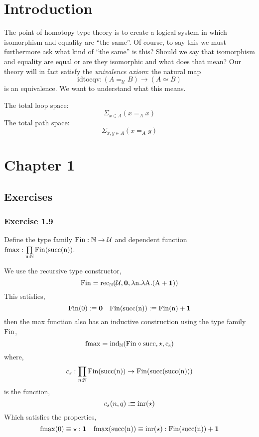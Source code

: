 \documentclass[12pt]{article}
\begin{document}
\newcommand{\rec}{\mathrm{rec}}
\newcommand{\ind}{\mathrm{ind}}
\renewcommand{\succ}{\mathrm{succ}}
\newcommand{\pr}{\mathrm{pr}}

\newcommand{\cU}{\mathcal{U}}

\section{Introduction}

The point of homotopy type theory is to create a logical system in which isomorphism and equality are ``the same''. Of course, to say this we must furthermore ask what kind of ``the same'' is this? Should we say that isomorphism and equality are equal or are they isomorphic and what does that mean? Our theory will in fact satisfy the \textit{univalence axiom}: the natural map
\[ \mathrm{idtoeqv} : (A =_{\cU} B) \to (A \simeq B) \]
is an equivalence. We want to understand what this means.

The total loop space:
\[ \Sigma_{x \in A} (x =_A x) \]
The total path space:
\[ \Sigma_{x,y \in A} (x =_A y) \]

\section{Chapter 1}

\subsection{Exercises}

\subsubsection{Exercise 1.9}

\begin{exercise}
Define the type family $\rm{Fin} : \mathbb{N} \to \mathcal{U}$ and dependent function $\rm{fmax} : \prod\limits_{n : \N} \rm{Fin}(\succ(n))$.
\end{exercise}

We use the recursive type constructor,
\[ \rm{Fin} = \rec_{\N}(\U, \bf{0}, \lambda n. \lambda A. (A + \bf{1})) \]
This satisfies,
\[ \rm{Fin}(0) :\equiv \bf{0} \quad \rm{Fin}(\succ(n)) :\equiv \rm{Fin}(n) + \bf{1} \] 
then the max function also has an inductive construction using the type family $\rm{Fin}$,
\[ \rm{fmax} = \ind_{\N}(\rm{Fin} \circ \succ, \star, c_s) \]
where,
\[ c_s : \prod_{n : \N} \rm{Fin}(\succ(n)) \to \rm{Fin}(\succ(\succ(n))) \]
is the function,
\[ c_s(n, q) :\equiv \rm{inr}(\star) \]
Which satisfies the properties,
\[ \rm{fmax}(0) \equiv \star : \bf{1} \quad \rm{fmax}(\succ(n)) \equiv \rm{inr}(\star) : \rm{Fin}(\succ(n)) + \bf{1} \]
\end{document}
